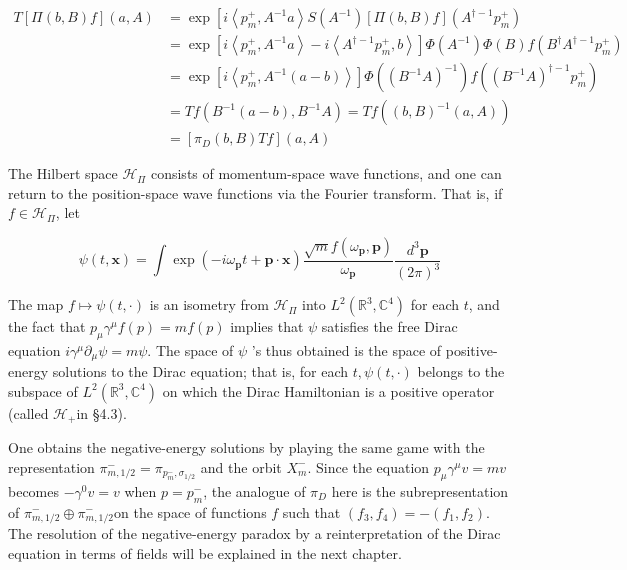 \documentclass[10pt, letterpaper]{article}
\begin{document}
$$
\begin{aligned}
T[\Pi(b, B) f](a, A) & =\exp \left[i\left\langle p_{m}^{+}, A^{-1} a\right\rangle S\left(A^{-1}\right)[\Pi(b, B) f]\left(A^{\dagger-1} p_{m}^{+}\right)\right. \\
& =\exp \left[i\left\langle p_{m}^{+}, A^{-1} a\right\rangle-i\left\langle A^{\dagger-1} p_{m}^{+}, b\right\rangle\right] \Phi\left(A^{-1}\right) \Phi(B) f\left(B^{\dagger} A^{\dagger-1} p_{m}^{+}\right) \\
& =\exp \left[i\left\langle p_{m}^{+}, A^{-1}(a-b)\right\rangle\right] \Phi\left(\left(B^{-1} A\right)^{-1}\right) f\left(\left(B^{-1} A\right)^{\dagger-1} p_{m}^{+}\right) \\
& =T f\left(B^{-1}(a-b), B^{-1} A\right)=T f\left((b, B)^{-1}(a, A)\right) \\
& =\left[\pi_{D}(b, B) T f\right](a, A)
\end{aligned}
$$

The Hilbert space $\mathcal{H}_{\Pi}$ consists of momentum-space wave functions, and one can return to the position-space wave functions via the Fourier transform. That is, if $f \in \mathcal{H}_{\Pi}$, let

$$
\psi(t, \mathbf{x})=\int \exp \left(-i \omega_{\mathbf{p}} t+\mathbf{p} \cdot \mathbf{x}\right) \frac{\sqrt{m} f\left(\omega_{\mathbf{p}}, \mathbf{p}\right)}{\omega_{\mathbf{p}}} \frac{d^{3} \mathbf{p}}{(2 \pi)^{3}}
$$

The map $f \mapsto \psi(t, \cdot)$ is an isometry from $\mathcal{H}_{\Pi}$ into $L^{2}\left(\mathbb{R}^{3}, \mathbb{C}^{4}\right)$ for each $t$, and the fact that $p_{\mu} \gamma^{\mu} f(p)=m f(p)$ implies that $\psi$ satisfies the free Dirac equation $i \gamma^{\mu} \partial_{\mu} \psi=m \psi$. The space of $\psi$ 's thus obtained is the space of positive-energy solutions to the Dirac equation; that is, for each $t, \psi(t, \cdot)$ belongs to the subspace of $L^{2}\left(\mathbb{R}^{3}, \mathbb{C}^{4}\right)$ on which the Dirac Hamiltonian is a positive operator (called $\mathcal{H}_{+}$in §4.3).

One obtains the negative-energy solutions by playing the same game with the representation $\pi_{m, 1 / 2}^{-}=\pi_{p_{m}^{-}, \sigma_{1 / 2}}$ and the orbit $X_{m}^{-}$. Since the equation $p_{\mu} \gamma^{\mu} v=m v$ becomes $-\gamma^{0} v=v$ when $p=p_{m}^{-}$, the analogue of $\pi_{D}$ here is the subrepresentation\\
of $\pi_{m, 1 / 2}^{-} \oplus \pi_{m, 1 / 2}^{-}$on the space of functions $f$ such that $\left(f_{3}, f_{4}\right)=-\left(f_{1}, f_{2}\right)$. The resolution of the negative-energy paradox by a reinterpretation of the Dirac equation in terms of fields will be explained in the next chapter.
\end{document}
